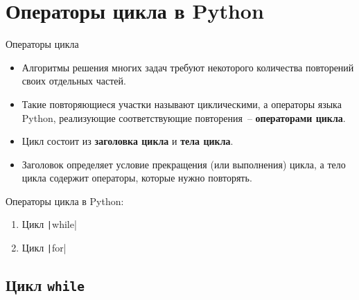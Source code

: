 \documentclass[aspectratio=169, mathserif]{beamer}	%
\begin{document}
\section{Операторы цикла в Python}
\sectionframe


\begin{frame}[fragile]{Операторы цикла}
\scriptsize	
\begin{itemize}
	\item Алгоритмы решения многих задач требуют некоторого количества повторений своих отдельных частей.
	\item Такие повторяющиеся участки называют циклическими, а операторы языка Python, реализующие соответствующие повторения~-- \textcolor{extraorange}{\textbf{операторами цикла}}.
	\item Цикл состоит из \textcolor{extraorange}{\textbf{заголовка цикла}} и \textcolor{extraorange}{\textbf{тела цикла}}.
	\item Заголовок определяет условие прекращения (или выполнения) цикла, а тело цикла содержит операторы, которые нужно повторять.
\end{itemize}

\bigskip	
Операторы цикла в Python:
\begin{enumerate}
	\item Цикл \texttt|while|
	\item Цикл \texttt|for|
\end{enumerate}
\vfill
\end{frame}

\subsection{Цикл \texttt{while}}
\end{document}
